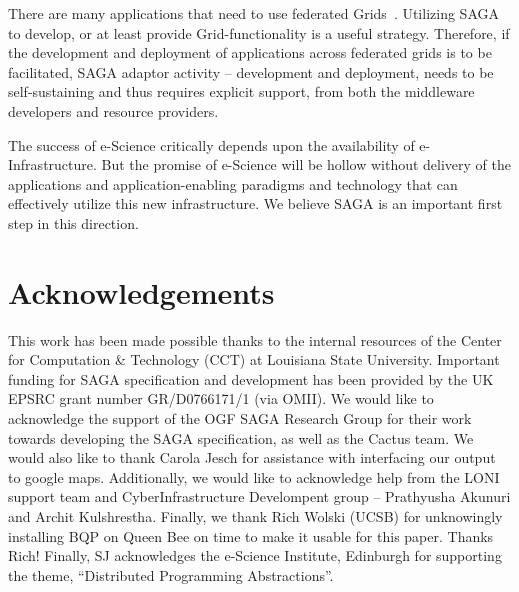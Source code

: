 \documentclass[conference,final]{IEEEtran}
\begin{document}
There are many applications that need to use federated
Grids~\cite{clade06, gin_paper}.  Utilizing SAGA to develop, or at
least provide Grid-functionality is a useful strategy. Therefore, if
the development and deployment of applications across federated grids
is to be facilitated, SAGA adaptor activity -- development and
deployment, needs to be self-sustaining and thus requires explicit
support, from both the middleware developers and resource providers.

The success of e-Science critically depends upon the availability of
e-Infrastructure.  But the promise of e-Science will be hollow without
delivery of the applications and application-enabling paradigms and
technology that can effectively utilize this new infrastructure. We
believe SAGA is an important first step in this direction.

\section{Acknowledgements}

This work has been made possible thanks to the internal resources of
the Center for Computation \& Technology (CCT) at Louisiana State
University.  Important funding for SAGA specification and development
has been provided by the UK EPSRC grant number GR/D0766171/1 (via
OMII).  We would like to acknowledge the support of the OGF SAGA
Research Group for their work towards developing the SAGA
specification, as well as the Cactus team. We would also like to thank
Carola Jesch for assistance with interfacing our output to google
maps. Additionally, we would like to acknowledge help from the LONI
support team and CyberInfrastructure Develompent group -- Prathyusha
Akunuri and Archit Kulshrestha.  Finally, we thank Rich Wolski (UCSB)
for unknowingly installing BQP on Queen Bee on time to make it usable
for this paper. Thanks Rich! Finally, SJ acknowledges the e-Science
Institute, Edinburgh for supporting the theme, ``Distributed
Programming Abstractions''.



\end{document}
